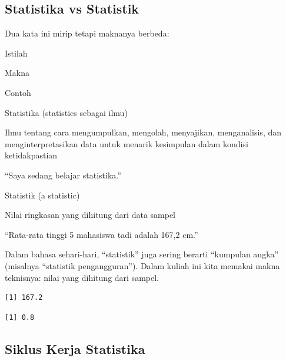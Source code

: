 \documentclass[
  indonesian,
  letterpaper,
]{book}
\newenvironment{Shaded}{\begin{snugshade}}{\end{snugshade}}
\newcommand{\CommentTok}[1]{\textcolor[rgb]{0.37,0.37,0.37}{#1}}
\newcommand{\FunctionTok}[1]{\textcolor[rgb]{0.28,0.35,0.67}{#1}}
\newcommand{\NormalTok}[1]{\textcolor[rgb]{0.00,0.23,0.31}{#1}}
\newcommand{\SpecialCharTok}[1]{\textcolor[rgb]{0.37,0.37,0.37}{#1}}
\begin{document}
\subsection{Statistika vs Statistik}\label{statistika-vs-statistik}

Dua kata ini mirip tetapi maknanya berbeda:

Istilah

Makna

Contoh

Statistika (statistics sebagai ilmu)

Ilmu tentang cara mengumpulkan, mengolah, menyajikan, menganalisis, dan
menginterpretasikan data untuk menarik kesimpulan dalam kondisi
ketidakpastian

``Saya sedang belajar statistika.''

Statistik (a statistic)

Nilai ringkasan yang dihitung dari data sampel

``Rata-rata tinggi 5 mahasiswa tadi adalah 167,2 cm.''

Dalam bahasa sehari-hari, ``statistik'' juga sering berarti ``kumpulan
angka'' (misalnya ``statistik pengangguran''). Dalam kuliah ini kita
memakai makna teknisnya: nilai yang dihitung dari sampel.

\begin{Shaded}
\end{Shaded}

\begin{verbatim}
[1] 167.2
\end{verbatim}

\begin{Shaded}
\end{Shaded}

\begin{verbatim}
[1] 0.8
\end{verbatim}

\subsection{Siklus Kerja Statistika}\label{siklus-kerja-statistika}
\end{document}
